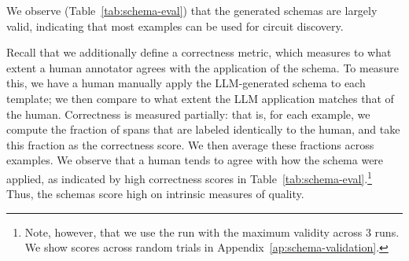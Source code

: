 \begin{table}[t]
    \centering
    \caption{\textbf{Validity} is an automatic evaluation metric that tells us how many examples are usable for circuit discovery. \textbf{Correctness} is a human evalation metric that tells us whether the schema were applied in a way that a human agrees with. By definition, the human schema have 100\% correctness.}
    \label{tab:schema-eval}
\end{table}

We observe (Table~\ref{tab:schema-eval}) that the generated schemas are largely valid, indicating that most examples can be used for circuit discovery.

Recall that we additionally define a correctness metric, which measures to what extent a human annotator agrees with the application of the schema. To measure this, we have a human manually apply the LLM-generated schema to each template; we then compare to what extent the LLM application matches that of the human. Correctness is measured partially: that is, for each example, we compute the fraction of spans that are labeled identically to the human, and take this fraction as the correctness score. We then average these fractions across examples. We observe that a human tends to agree with how the schema were applied, as indicated by high correctness scores in Table~\ref{tab:schema-eval}.\footnote{Note, however, that we use the run with the maximum validity across 3 runs. We show scores across random trials in Appendix~\ref{ap:schema-validation}.} Thus, the schemas score high on intrinsic measures of quality. 



